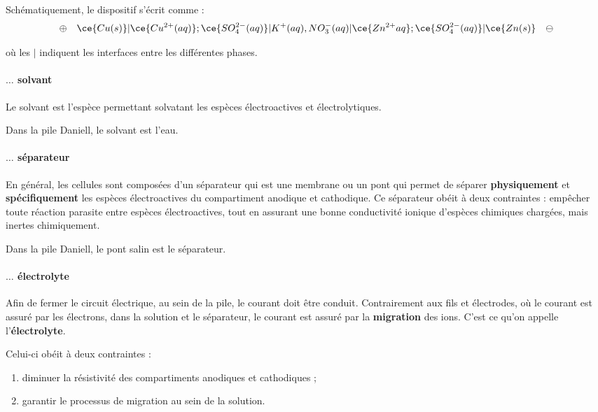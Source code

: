 Schématiquement, le dispositif s'écrit comme : 
\begin{equation}
\oplus \quad \ce{Cu(s)} | \ce{Cu^{2+} (aq)}; \ce{SO_4^{2-} (aq)} | K^+ (aq), NO_3^- (aq) | \ce{Zn^{2+} {aq}}; \ce{SO_4^{2-} (aq)} | \ce{Zn(s)} \quad \ominus
\label{eq:pileCuZn}
\end{equation}

où les $|$ indiquent les interfaces entre les différentes phases.


\paragraph*{$\ldots$ solvant} Le solvant est l'espèce permettant solvatant les espèces électroactives et électrolytiques.

Dans la pile Daniell, le solvant est l'eau.

\paragraph*{$\ldots$ séparateur} En général, les cellules sont composées d'un séparateur qui est une membrane ou un pont qui permet de séparer \textbf{physiquement} et \textbf{spécifiquement} les espèces électroactives du compartiment anodique et cathodique. Ce séparateur obéit à deux contraintes : empêcher toute réaction parasite entre espèces électroactives, tout en assurant une bonne conductivité ionique d'espèces chimiques chargées, mais inertes chimiquement.

Dans la pile Daniell, le pont salin est le séparateur.

\paragraph*{$\ldots$ électrolyte} Afin de fermer le circuit électrique, au sein de la pile, le courant doit être conduit. Contrairement aux fils et électrodes, où le courant est assuré par les électrons, dans la solution et le séparateur, le courant est assuré par la \textbf{migration} des ions. C'est ce qu'on appelle l'\textbf{électrolyte}.

Celui-ci obéit à deux contraintes : 
\begin{enumerate}
    \item diminuer la résistivité des compartiments anodiques et cathodiques ;
    \item garantir le processus de migration au sein de la solution.
\end{enumerate}

